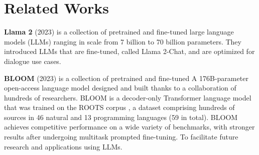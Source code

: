 \documentclass[fleqn,moreauthors,10pt]{ds_report}
\begin{document}
	



\section*{Related Works}

\noindent
\textbf{Llama 2} (2023) \cite{touvron2023llama} is a collection of pretrained and fine-tuned
large language models (LLMs) ranging in scale from 7 billion to 70 billion parameters.
They introduced LLMs that are fine-tuned, called Llama 2-Chat, and are optimized for dialogue use cases.

\noindent
\textbf{BLOOM} (2023) \cite{workshop2023bloom} is a collection of pretrained and fine-tuned
A 176B-parameter open-access language model designed and built thanks to a collaboration of hundreds of researchers. BLOOM is a decoder-only Transformer language model that was trained on the ROOTS corpus \cite{laurençon2023bigscience}, a dataset comprising hundreds of
sources in 46 natural and 13 programming languages (59 in total). BLOOM achieves competitive performance on a wide variety of benchmarks, with stronger results after undergoing multitask prompted fine-tuning. To facilitate future research and applications using LLMs.
\end{document}
